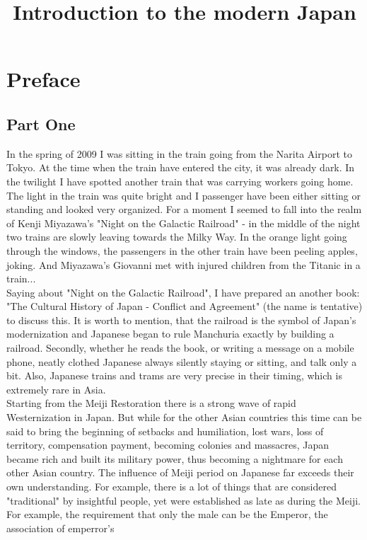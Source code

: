 \documentclass[11pt]{book}
\title{Introduction to the modern Japan}
\begin{document}
\maketitle
\section*{Preface}
\subsection*{Part One}
In the spring of 2009 I was sitting in the train going from the Narita Airport to Tokyo. At the time when the train have entered the city, it was
already dark. In the twilight I have spotted another train that was carrying workers going home. The light in the train was quite bright and I
passenger have been either sitting or standing and looked very organized. For a moment I seemed to fall into the realm of Kenji Miyazawa's "Night
on the Galactic Railroad" - in the middle of the night two trains are slowly leaving towards the Milky Way. In the orange light going through the windows, the passengers in the other train have been peeling apples,
joking. And Miyazawa's Giovanni met with injured children from the Titanic in a train...\\
Saying about "Night on the Galactic Railroad", I have prepared an another book: "The Cultural History of Japan - Conflict and Agreement" (the name is tentative) to discuss this. It is worth to mention, that the railroad is
the symbol of Japan's modernization and Japanese began to rule Manchuria exactly by building a railroad. Secondly, whether he reads the book, or writing a message on a mobile phone, neatly clothed Japanese always silently staying or
sitting, and talk only a bit. Also, Japanese trains and trams are very precise in their timing, which is extremely rare in Asia.\\
Starting from the Meiji Restoration there is a strong wave of rapid Westernization in Japan. But while for the other Asian countries this time
can be said to bring the beginning of setbacks and humiliation, lost wars, loss of territory, compensation payment, becoming colonies and
massacres, Japan became rich and built its military power, thus becoming a nightmare for each other Asian country. The influence of Meiji period
on Japanese far exceeds their own understanding. For example, there is a lot of things that are considered "traditional" by insightful people,
yet were established as late as during the Meiji. For example, the requirement that only the male can be the Emperor, the association of emperror's
\end{document}
